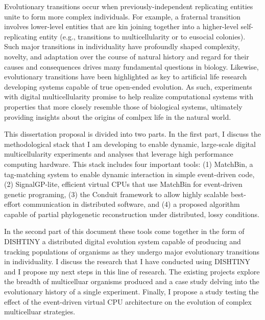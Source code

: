 Evolutionary transitions occur when previously-independent replicating entities unite to form more complex individuals.
For example, a fraternal transition involves lower-level entities that are kin joining together into a higher-level self-replicating entity (e.g., transitions to multicellularity or to eusocial colonies).
Such major transitions in individuality have profoundly shaped complexity, novelty, and adaptation over the course of natural history and regard for their causes and consequences drives many fundamental questions in biology.
Likewise, evolutionary transitions have been highlighted as key to artificial life research developing systems capable of true open-ended evolution.
As such, experiments with digital multicellularity promise to help realize computational systems with properties that more closely resemble those of biological systems, ultimately providing insights about the origins of comlpex life in the natural world.

This dissertation proposal is divided into two parts. 
In the first part, I discuss the methodological stack that I am developing to enable dynamic, large-scale digital multicellularity experiments and analyses that leverage high performance computing hardware.
This stack includes four important tools:
(1) MatchBin, a tag-matching system to enable dynamic interaction in simple event-driven code,
(2) SignalGP-lite, efficient virtual CPUs that use MatchBin for event-driven genetic programing,
(3) the Conduit framework to allow highly scalable best-effort communication in distributed software, and
(4) a proposed algorithm capable of partial phylogenetic reconstruction under distributed, lossy conditions.

In the second part of this document these tools come together in the form of DISHTINY a distributed digital evolution system capable of producing and tracking populations of organisms as they undergo major evolutionary transitions in individuality.
I discuss the research that I have conducted using DISHTINY and I propose my next steps in this line of research.
The existing projects explore the breadth of multicelluar organisms produced and a case study delving into the evolutionary history of a single experiment.
Finally, I propose a study testing the effect of the event-driven virtual CPU architecture on the evolution of complex multicelluar strategies.
